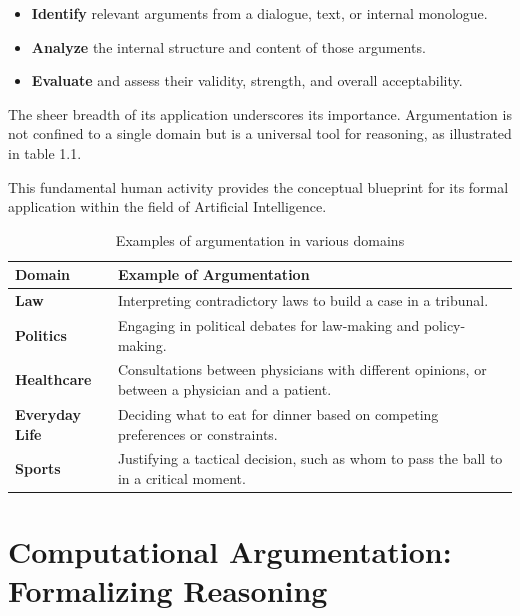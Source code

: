 \documentclass{scrbook}
\begin{document}
\begin{itemize}
    \item 
    \textbf{Identify} relevant arguments from a dialogue, text, or internal monologue.

    \item 
    \textbf{Analyze} the internal structure and content of those arguments.

    \item 
    \textbf{Evaluate} and assess their validity, strength, and overall acceptability.
\end{itemize}

The sheer breadth of its application underscores its importance. Argumentation is not confined to a single domain but is a universal tool for reasoning, as illustrated in table 1.1.

This fundamental human activity provides the conceptual blueprint for its formal application within the field of Artificial Intelligence.

\begin{table}
    \centering
    \begin{tabularx}{\textwidth}{|p{5em}|X|} \hline
        \textbf{Domain} & \textbf{Example of Argumentation} \\ \hline

        \textbf{Law} &
        Interpreting contradictory laws to build a case in a tribunal. \\ \hline

        \textbf{Politics} &
        Engaging in political debates for law-making and policy-making. \\ \hline

        \textbf{Healthcare} &
        Consultations between physicians with different opinions, or between a physician and a patient. \\ \hline

        \textbf{Everyday Life} &
        Deciding what to eat for dinner based on competing preferences or constraints. \\ \hline

        \textbf{Sports} &
        Justifying a tactical decision, such as whom to pass the ball to in a critical moment. \\ \hline

    \end{tabularx}
    \caption{Examples of argumentation in various domains}
\end{table}

\chapter{Computational Argumentation: Formalizing Reasoning}
\end{document}
